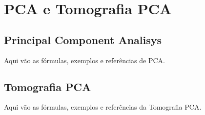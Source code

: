 


\chapter{PCA e Tomografia PCA}
\label{sec:PCAeTomoPCA}
\ojo

\section{Principal Component Analisys}
\label{sec:PCAeTomoPCA:PCA}
\ojo
Aqui vão as fórmulas, exemplos e referências de PCA.


\section{Tomografia PCA}
\label{sec:PCAeTomoPCA:TomoPCA}
\ojo
Aqui vão as fórmulas, exemplos e referências da Tomografia PCA.

